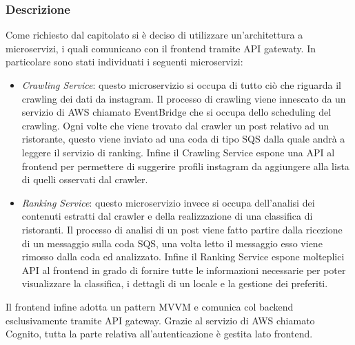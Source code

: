 \subsubsection{Descrizione}
Come richiesto dal capitolato si è deciso di utilizzare un'architettura a microservizi, i quali comunicano con il frontend tramite API gatewaty.
In particolare sono stati individuati i seguenti microservizi:
\begin{itemize}
    \item \textit{Crawling Service}: questo microservizio si occupa di tutto ciò che riguarda il crawling dei dati da instagram. Il processo di crawling viene innescato da un servizio di AWS chiamato EventBridge che si occupa dello scheduling del crawling. Ogni volte che viene trovato dal crawler un post relativo ad un ristorante, questo viene inviato ad una coda di tipo SQS dalla quale andrà a leggere il servizio di ranking. Infine il Crawling Service espone una API al frontend per permettere di suggerire profili instagram da aggiungere alla lista di quelli osservati dal crawler.
    \item \textit{Ranking Service}: questo microservizio invece si occupa dell'analisi dei contenuti estratti dal crawler e della realizzazione di una classifica di ristoranti. Il processo di analisi di un post viene fatto partire dalla ricezione di un messaggio sulla coda SQS, una volta letto il messaggio esso viene rimosso dalla coda ed analizzato. Infine il Ranking Service espone molteplici API al frontend in grado di fornire tutte le informazioni necessarie per poter visualizzare la classifica, i dettagli di un locale e la gestione dei preferiti.
\end{itemize}
Il frontend infine adotta un pattern MVVM e comunica col backend esclusivamente tramite API gateway. Grazie al servizio di AWS chiamato Cognito, tutta la parte relativa all'autenticazione è gestita lato frontend.